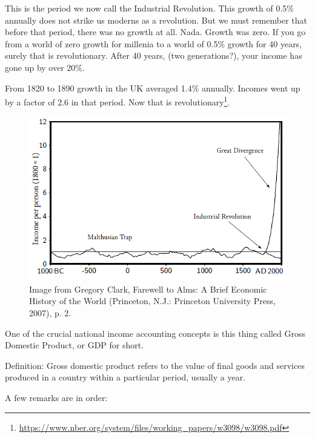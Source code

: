 \documentclass[
]{book}
\begin{document}
This is the period we now call the Industrial Revolution. This growth of 0.5\% annually does not strike us moderns as a revolution. But we must remember that before that period, there was no growth at all. Nada. Growth was zero. If you go from a world of zero growth for millenia to a world of 0.5\% growth for 40 years, surely that is revolutionary. After 40 years, (two generations?), your income has gone up by over 20\%.

From 1820 to 1890 growth in the UK averaged 1.4\% annually. Incomes went up by a factor of 2.6 in that period. Now that is revolutionary\footnote{\url{https://www.nber.org/system/files/working_papers/w3098/w3098.pdf}}.

\begin{figure}
\includegraphics[width=1\linewidth]{img/ch1/fig2} \caption{Image from Gregory Clark, Farewell to Alms: A Brief Economic History of the World (Princeton, N.J.: Princeton University Press, 2007), p. 2.}\label{fig:fig102}
\end{figure}

One of the crucial national income accounting concepts is this thing called Gross Domestic Product, or GDP for short.

Definition: Gross domestic product refers to the value of final goods and services produced in a country within a particular period, usually a year.

A few remarks are in order:
\end{document}

